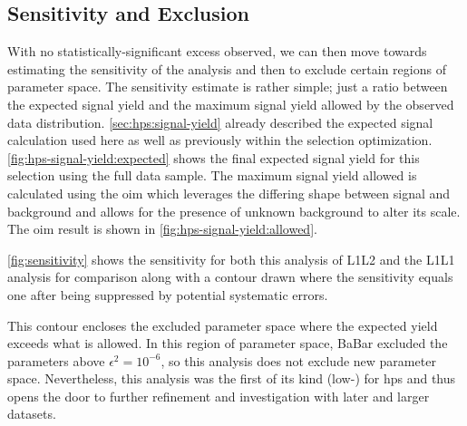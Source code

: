 \subsection{Sensitivity and Exclusion}
With no statistically-significant excess observed, we can then move towards estimating the sensitivity of
the analysis and then to exclude certain regions of parameter space.
The sensitivity estimate is rather simple; just a ratio between the expected signal yield
and the maximum signal yield allowed by the observed data distribution.
\cref{sec:hps:signal-yield} already described the expected signal calculation used here
as well as previously within the selection optimization.
\cref{fig:hps-signal-yield:expected} shows the final expected signal yield for this selection
using the full data sample.
The maximum signal yield allowed is calculated using the \ac{oim} \cite{yellin-oim:2002}
which leverages the differing shape between signal and background and allows for the presence
of unknown background to alter its scale.
The \ac{oim} result is shown in \cref{fig:hps-signal-yield:allowed}.

\cref{fig:sensitivity} shows the sensitivity for both this analysis of L1L2 and the L1L1 analysis
for comparison along with a contour drawn where the sensitivity equals one after being suppressed
by potential systematic errors.

This contour encloses the excluded parameter space where the expected yield exceeds what is allowed.
In this region of parameter space, BaBar\cite{babar-2017}
excluded the parameters above $\epsilon^2 = 10^{-6}$, so this analysis does not exclude new parameter space.
Nevertheless, this analysis was the first of its kind (low-\Psum) for \ac{hps} and thus
opens the door to further refinement and investigation with later and larger datasets.

